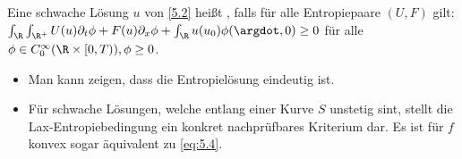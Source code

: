 \begin{df}[Entropielösung] \label{5.5}
    Eine schwache Lösung $u$ von \ref{5.2} heißt , falls für alle Entropiepaare $(U, F)$ gilt:
    \begin{math}[numbered] \label{eq:5.4}
        \int_\R \int_{\R^+} U(u) \partial_t \phi + F(u) \partial_x \phi + \int_\R u(u_0) \phi(\argdot, 0) \ge 0
    \end{math}
    für alle $\phi \in C_0^\infty(\R \times [0,T)), \phi \ge 0$.
    \begin{note}
        \begin{itemize}
            \item
                Man kann zeigen, dass die Entropielösung eindeutig ist.
            \item
                Für schwache Lösungen, welche entlang einer Kurve $S$ unstetig sint, stellt die Lax-Entropiebedingung ein konkret nachprüfbares Kriterium dar.
                Es ist für $f$ konvex sogar äquivalent zu \ref{eq:5.4}.
        \end{itemize}
    \end{note}
\end{df}

